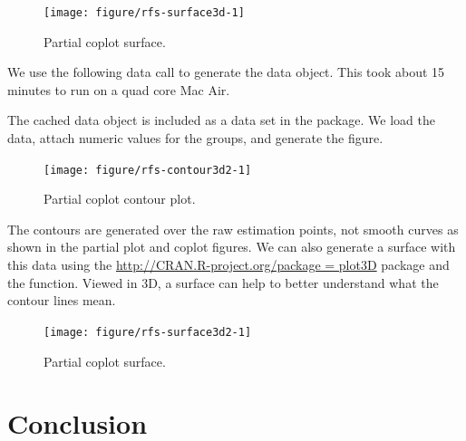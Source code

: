 \documentclass[nojss]{jss}\usepackage[]{graphicx}\usepackage[]{color}
\begin{document}
\begin{Schunk}
\begin{figure}[!htpb]

{\centering \texttt{[image: figure/rfs-surface3d-1]} 

}

\caption[Partial coplot surface]{Partial coplot surface.\label{fig:surface3d}}
\end{figure}
\end{Schunk}





We use the following data call to generate the  data object. This took about 15 minutes to run on a quad core Mac Air.



The cached  data object is included as a data set in the  package. We load the data, attach numeric values for the  groups, and generate the figure.

\begin{Schunk}
\begin{figure}[!htpb]

{\centering \texttt{[image: figure/rfs-contour3d2-1]} 

}

\caption[Partial coplot contour plot]{Partial coplot contour plot.\label{fig:contour3d2}}
\end{figure}
\end{Schunk}

The contours are generated over the raw  estimation points, not smooth curves as shown in the partial plot and coplot figures. We can also generate a surface with this data using the  \url{http://CRAN.R-project.org/package = plot3D} package and the  function. Viewed in 3D, a surface can help to better understand what the contour lines mean. 

\begin{Schunk}
\begin{figure}[!htpb]

{\centering \texttt{[image: figure/rfs-surface3d2-1]} 

}

\caption[Partial coplot surface]{Partial coplot surface.\label{fig:surface3d2}}
\end{figure}
\end{Schunk}

\section{Conclusion}

\appendix


\end{document}
